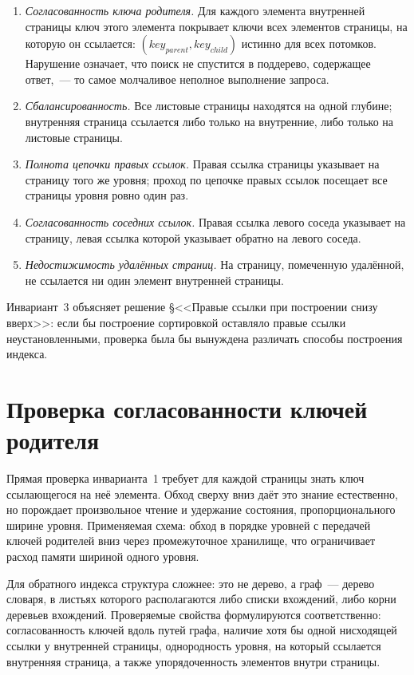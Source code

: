 \begin{enumerate}
\item \emph{Согласованность ключа родителя.} Для каждого элемента внутренней
      страницы ключ этого элемента покрывает ключи всех элементов страницы, на
      которую он ссылается: $(key_{parent}, key_{child})$
      истинно для всех потомков. Нарушение означает, что поиск не спустится в
      поддерево, содержащее ответ,~--- то самое молчаливое неполное
      выполнение запроса.
\item \emph{Сбалансированность.} Все листовые страницы находятся на одной
      глубине; внутренняя страница ссылается либо только на внутренние, либо
      только на листовые страницы.
\item \emph{Полнота цепочки правых ссылок.} Правая ссылка страницы указывает на
      страницу того же уровня; проход по цепочке правых ссылок посещает все
      страницы уровня ровно один раз.
\item \emph{Согласованность соседних ссылок.} Правая ссылка левого соседа
      указывает на страницу, левая ссылка которой указывает обратно на левого
      соседа.
\item \emph{Недостижимость удалённых страниц.} На страницу, помеченную
      удалённой, не ссылается ни один элемент внутренней страницы.
\end{enumerate}

Инвариант~3 объясняет решение §<<Правые ссылки при построении снизу вверх>>:
если бы построение сортировкой оставляло правые ссылки неустановленными,
проверка была бы вынуждена различать способы построения индекса.

\section{Проверка согласованности ключей родителя}
\label{sec:parent-check}

Прямая проверка инварианта~1 требует для каждой страницы знать ключ ссылающегося
на неё элемента. Обход сверху вниз даёт это знание естественно, но порождает
произвольное чтение и удержание состояния, пропорционального ширине уровня.
Применяемая схема: обход в порядке уровней с передачей ключей родителей вниз
через промежуточное хранилище, что ограничивает расход памяти шириной одного
уровня.

Для обратного индекса структура сложнее: это не дерево, а граф~--- дерево
словаря, в листьях которого располагаются либо списки вхождений, либо корни
деревьев вхождений. Проверяемые свойства формулируются соответственно:
согласованность ключей вдоль путей графа, наличие хотя бы одной нисходящей
ссылки у внутренней страницы, однородность уровня, на который ссылается
внутренняя страница, а также упорядоченность элементов внутри страницы.

